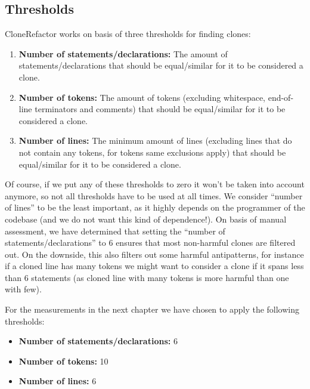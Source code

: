 \documentclass[a4paper]{article}
\begin{document}
\subsection{Thresholds}
CloneRefactor works on basis of three thresholds for finding clones:
\begin{enumerate}
  \item \textbf{Number of statements/declarations:} The amount of statements/declarations that should be equal/similar for it to be considered a clone.
  \item \textbf{Number of tokens:} The amount of tokens (excluding whitespace, end-of-line terminators and comments) that should be equal/similar for it to be considered a clone.
  \item \textbf{Number of lines:} The minimum amount of lines (excluding lines that do not contain any tokens, for tokens same exclusions apply) that should be equal/similar for it to be considered a clone.
\end{enumerate}
Of course, if we put any of these thresholds to zero it won't be taken into account anymore, so not all thresholds have to be used at all times. We consider ``number of lines'' to be the least important, as it highly depends on the programmer of the codebase (and we do not want this kind of dependence!). On basis of manual assessment, we have determined that setting the ``number of statements/declarations'' to 6 ensures that most non-harmful clones are filtered out. On the downside, this also filters out some harmful antipatterns, for instance if a cloned line has many tokens we might want to consider a clone if it spans less than 6 statements (as cloned line with many tokens is more harmful than one with few).

For the measurements in the next chapter we have chosen to apply the following thresholds:
\begin{itemize}
  \item \textbf{Number of statements/declarations:} 6
  \item \textbf{Number of tokens:} 10
  \item \textbf{Number of lines:} 6
\end{itemize}
\end{document}

